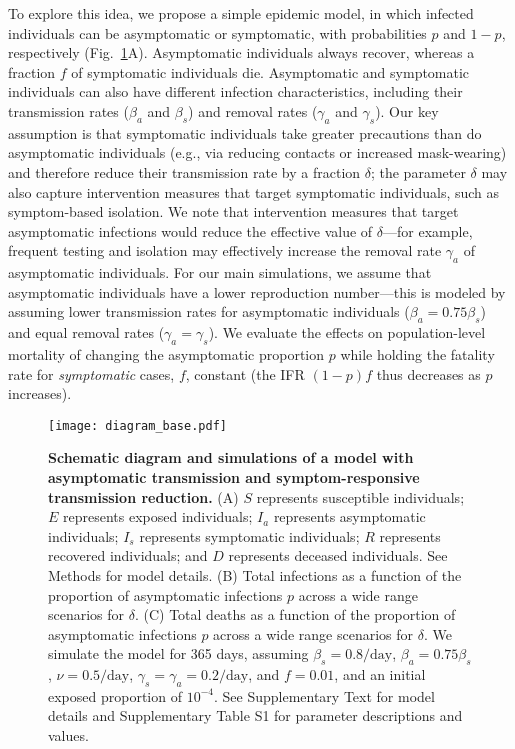 \documentclass[12pt]{article}
\newcommand{\fref}[1]{Fig.~\ref{fig:#1}}
\begin{document}
To explore this idea, we propose a simple epidemic model,
in which infected individuals can be asymptomatic or symptomatic, with probabilities $p$ and $1-p$, respectively (\fref{base}A).  
Asymptomatic individuals always recover, whereas a fraction $f$ of symptomatic individuals die.
Asymptomatic and symptomatic individuals can also have different infection characteristics, including their transmission rates ($\beta_a$ and $\beta_s$) and removal rates ($\gamma_a$ and $\gamma_s$).
Our key assumption is that symptomatic individuals take greater precautions than do asymptomatic individuals (e.g., via reducing contacts or increased mask-wearing) and therefore reduce their transmission rate by a fraction $\delta$;
the parameter $\delta$ may also capture intervention measures that target symptomatic individuals, such as symptom-based isolation. 
We note that intervention measures that target asymptomatic infections would reduce the effective value of $\delta$---for example, frequent testing and isolation may effectively increase the removal rate $\gamma_a$ of asymptomatic individuals.
For our main simulations, we assume that asymptomatic individuals have a lower reproduction number---this is modeled by assuming lower transmission rates for asymptomatic individuals ($\beta_a = 0.75 \beta_s$) and equal removal rates ($\gamma_a = \gamma_s$).
We evaluate the effects on population-level mortality of changing the asymptomatic proportion $p$ while holding the fatality rate for \emph{symptomatic} cases, $f$, constant (the IFR $(1-p)f$ thus decreases as $p$ increases).
\begin{figure}[!ht]
\texttt{[image: diagram\_base.pdf]}
\caption{
\textbf{Schematic diagram and simulations of a model with asymptomatic transmission and symptom-responsive transmission reduction.}
(A) $S$ represents susceptible individuals; $E$ represents exposed individuals; $I_a$ represents asymptomatic individuals; $I_s$ represents symptomatic individuals; $R$ represents recovered individuals; and $D$ represents deceased individuals. See Methods for model details.
(B) Total infections as a function of the proportion of asymptomatic infections $p$ across a wide range scenarios for $\delta$.
(C) Total deaths as a function of the proportion of asymptomatic infections $p$ across a wide range scenarios for $\delta$.
We simulate the model for 365 days, assuming $\beta_s = 0.8/\mathrm{day}$, $\beta_a = 0.75 \beta_s$, $\nu=0.5/\mathrm{day}$, $\gamma_s=\gamma_a=0.2/\mathrm{day}$, and $f=0.01$, and an initial exposed proportion of $10^{-4}$.
See Supplementary Text for model details and Supplementary Table S1 for parameter descriptions and values.
}
\label{fig:base}
\end{figure}
\end{document}
